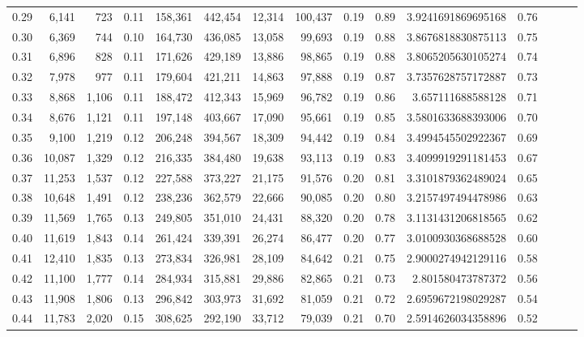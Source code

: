\begin{tabular}{rrrrrrrrrrrrrrr}
0.29 &   6,141 &    723 &  0.11 &  158,361 &  442,454 &   12,314 &  100,437 &  0.19 &  0.89 &    3.9241691869695168 &      0.76 \\
0.30 &   6,369 &    744 &  0.10 &  164,730 &  436,085 &   13,058 &   99,693 &  0.19 &  0.88 &    3.8676818830875113 &      0.75 \\
0.31 &   6,896 &    828 &  0.11 &  171,626 &  429,189 &   13,886 &   98,865 &  0.19 &  0.88 &    3.8065205630105274 &      0.74 \\
0.32 &   7,978 &    977 &  0.11 &  179,604 &  421,211 &   14,863 &   97,888 &  0.19 &  0.87 &    3.7357628757172887 &      0.73 \\
0.33 &   8,868 &  1,106 &  0.11 &  188,472 &  412,343 &   15,969 &   96,782 &  0.19 &  0.86 &     3.657111688588128 &      0.71 \\
0.34 &   8,676 &  1,121 &  0.11 &  197,148 &  403,667 &   17,090 &   95,661 &  0.19 &  0.85 &    3.5801633688393006 &      0.70 \\
0.35 &   9,100 &  1,219 &  0.12 &  206,248 &  394,567 &   18,309 &   94,442 &  0.19 &  0.84 &    3.4994545502922367 &      0.69 \\
0.36 &  10,087 &  1,329 &  0.12 &  216,335 &  384,480 &   19,638 &   93,113 &  0.19 &  0.83 &    3.4099919291181453 &      0.67 \\
0.37 &  11,253 &  1,537 &  0.12 &  227,588 &  373,227 &   21,175 &   91,576 &  0.20 &  0.81 &    3.3101879362489024 &      0.65 \\
0.38 &  10,648 &  1,491 &  0.12 &  238,236 &  362,579 &   22,666 &   90,085 &  0.20 &  0.80 &    3.2157497494478986 &      0.63 \\
0.39 &  11,569 &  1,765 &  0.13 &  249,805 &  351,010 &   24,431 &   88,320 &  0.20 &  0.78 &    3.1131431206818565 &      0.62 \\
0.40 &  11,619 &  1,843 &  0.14 &  261,424 &  339,391 &   26,274 &   86,477 &  0.20 &  0.77 &    3.0100930368688528 &      0.60 \\
0.41 &  12,410 &  1,835 &  0.13 &  273,834 &  326,981 &   28,109 &   84,642 &  0.21 &  0.75 &    2.9000274942129116 &      0.58 \\
0.42 &  11,100 &  1,777 &  0.14 &  284,934 &  315,881 &   29,886 &   82,865 &  0.21 &  0.73 &     2.801580473787372 &      0.56 \\
0.43 &  11,908 &  1,806 &  0.13 &  296,842 &  303,973 &   31,692 &   81,059 &  0.21 &  0.72 &    2.6959672198029287 &      0.54 \\
0.44 &  11,783 &  2,020 &  0.15 &  308,625 &  292,190 &   33,712 &   79,039 &  0.21 &  0.70 &    2.5914626034358896 &      0.52 \\

\end{tabular}
